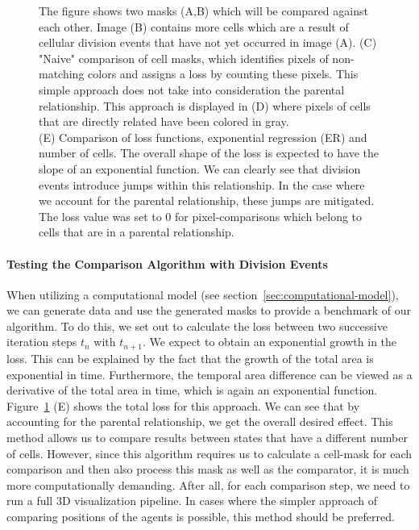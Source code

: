 \documentclass{article}
\begin{document}
\begin{figure}
\begin{minipage}{0.49\textwidth}
\begin{tikzonimage}[width=\textwidth]
        \end{tikzonimage}
    \end{minipage}
    \caption{
        The figure shows two masks (A,B) which will be compared against each other.
        Image (B) contains more cells which are a result of cellular division events that have not
        yet occurred in image (A).
        (C) "Naive" comparison of cell masks, which identifies pixels of non-matching colors and
        assigns a loss by counting these pixels.
        This simple approach does not take into consideration the parental relationship.
        This approach is displayed in (D) where pixels of cells that are directly related have been
        colored in gray.\\
        (E) Comparison of loss functions, exponential regression (ER) and number of cells.
        The overall shape of the loss is expected to have the slope of an exponential function.
        We can clearly see that division events introduce jumps within this relationship.
        In the case where we account for the parental relationship, these jumps are mitigated.
        The loss value was set to $0$ for pixel-comparisons which belong to cells that are in a
        parental relationship.
    }
    \label{fig:mask-difference-metric}
\end{figure}

\paragraph{Testing the Comparison Algorithm with Division Events}
When utilizing a computational model (see section~\ref{sec:computational-model}), we can generate
data and use the generated masks to provide a benchmark of our algorithm.
To do this, we set out to calculate the loss between two successive iteration steps
$t_n$ with $t_{n+1}$.
We expect to obtain an exponential growth in the loss.
This can be explained by the fact that the growth of the total area is exponential in time.
Furthermore, the temporal area difference can be viewed as a derivative of the total area in time,
which is again an exponential function.
Figure~\ref{fig:mask-difference-metric} (E) shows the total loss for this approach.
We can see that by accounting for the parental relationship, we get the overall desired effect.
This method allows us to compare results between states that have a different number of cells.
However, since this algorithm requires us to calculate a cell-mask for each comparison and then also
process this mask as well as the comparator, it is much more computationally demanding.
After all, for each comparison step, we need to run a full 3D visualization pipeline.
In cases where the simpler approach of comparing positions of the agents is possible, this method
should be preferred.
\end{document}
